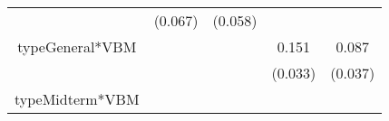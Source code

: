 \documentclass[12pt,twoside]{reedthesis}
\begin{document}
\begin{longtable}[]{@{}ccccc@{}}
\begin{minipage}[t]{0.12\columnwidth}
  \strut
  \end{minipage} & \begin{minipage}[t]{0.12\columnwidth}\centering\strut
  (0.067)\strut
  \end{minipage} & \begin{minipage}[t]{0.12\columnwidth}\centering\strut
  (0.058)\strut
  \end{minipage}\tabularnewline
  \begin{minipage}[t]{0.26\columnwidth}\centering\strut
  typeGeneral*VBM\strut
  \end{minipage} & \begin{minipage}[t]{0.12\columnwidth}\centering\strut
  \strut
  \end{minipage} & \begin{minipage}[t]{0.12\columnwidth}\centering\strut
  \strut
  \end{minipage} & \begin{minipage}[t]{0.12\columnwidth}\centering\strut
  0.151\strut
  \end{minipage} & \begin{minipage}[t]{0.12\columnwidth}\centering\strut
  0.087\strut
  \end{minipage}\tabularnewline
  \begin{minipage}[t]{0.26\columnwidth}\centering\strut
  \strut
  \end{minipage} & \begin{minipage}[t]{0.12\columnwidth}\centering\strut
  \strut
  \end{minipage} & \begin{minipage}[t]{0.12\columnwidth}\centering\strut
  \strut
  \end{minipage} & \begin{minipage}[t]{0.12\columnwidth}\centering\strut
  (0.033)\strut
  \end{minipage} & \begin{minipage}[t]{0.12\columnwidth}\centering\strut
  (0.037)\strut
  \end{minipage}\tabularnewline
  \begin{minipage}[t]{0.26\columnwidth}\centering\strut
  typeMidterm*VBM\strut
  \end{minipage} & \begin{minipage}[t]{0.12\columnwidth}\centering\strut
  \strut
  \end{minipage} & \begin{minipage}[t]{0.12\columnwidth}\centering\strut
  \strut
  \end{minipage} & \begin{minipage}[t]{0.12\columnwidth}\centering\strut

\end{minipage}
\end{longtable}
\end{document}
